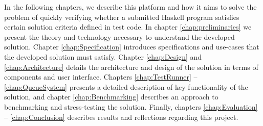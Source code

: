 In the following chapters, we describe this platform and how it aims to solve the problem of quickly verifying whether a submitted Haskell program satisfies certain solution criteria defined in test code. 
In chapter \ref{chap:preliminaries} we present the theory and technology necessary to understand the developed solution. 
Chapter \ref{chap:Specification} introduces specifications and use-cases that the developed solution must satisfy. 
Chapter \ref{chap:Design} and \ref{chap:Architecture} details the architecture and design of the solution in terms of components and user interface.
Chapters \ref{chap:TestRunner} -- \ref{chap:QueueSystem} presents a detailed description of key functionality of the solution, and chapter \ref{chap:Benchmarking} describes an approach to benchmarking and stress-testing the solution. 
Finally, chapters \ref{chap:Evaluation} -- \ref{chap:Conclusion} describes results and reflections regarding this project.



